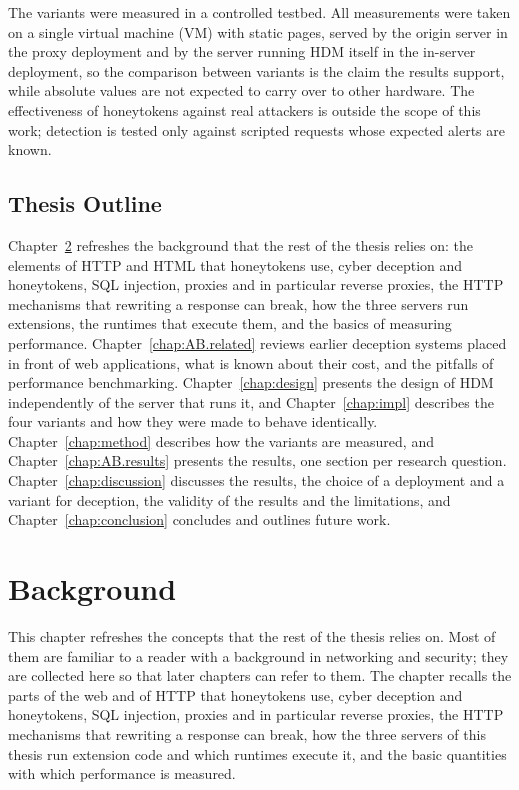 \documentclass{rptuma}
\begin{document}
The variants were measured in a controlled testbed. All measurements were taken on a single
virtual machine (VM) with static pages, served by the origin server in the proxy deployment and by
the server running HDM itself in the in-server deployment, so the comparison between variants is the claim
the results support, while absolute values are not expected to carry over to other hardware. The effectiveness of honeytokens against real attackers is outside the scope of this
work; detection is tested only against scripted requests whose expected alerts are known.

\section{Thesis Outline}
\label{sec:intro.outline}

Chapter~\ref{chap:background} refreshes the background that the rest of the thesis relies on: the
elements of HTTP and HTML that honeytokens use, cyber deception and honeytokens, SQL injection,
proxies and in particular reverse proxies, the HTTP mechanisms that rewriting a response can break,
how the three servers run extensions, the runtimes that execute them, and the basics of
measuring performance. Chapter~\ref{chap:AB.related} reviews earlier deception systems placed in
front of web applications, what is known about their cost, and the pitfalls of performance
benchmarking. Chapter~\ref{chap:design} presents the design of HDM independently of the server that runs
it, and Chapter~\ref{chap:impl} describes the four variants and how they were made to behave
identically. Chapter~\ref{chap:method} describes how the variants are measured, and
Chapter~\ref{chap:AB.results} presents the results, one section per research question.
Chapter~\ref{chap:discussion} discusses the results, the choice of a deployment and a variant for deception, the
validity of the results and the limitations, and Chapter~\ref{chap:conclusion} concludes and outlines
future work.

\chapter{Background}
\label{chap:background}

This chapter refreshes the concepts that the rest of the thesis relies on. Most of them are
familiar to a reader with a background in networking and security; they are collected here so that
later chapters can refer to them. The chapter recalls the parts of the web and of HTTP that
honeytokens use, cyber deception and honeytokens, SQL injection, proxies and in particular reverse
proxies, the HTTP mechanisms that rewriting a response can break, how the three servers of this
thesis run extension code and which runtimes execute it, and the basic quantities with which
performance is measured.
\end{document}
